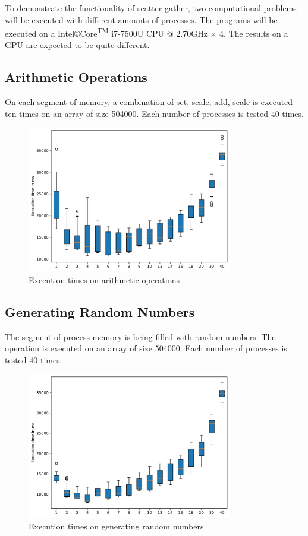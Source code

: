 \documentclass[a4paper]{article}
\begin{document}
To demonstrate the functionality of scatter-gather, two computational problems will be executed with different amounts of processes. The programs will be executed on a Intel\copyright Core\textsuperscript{TM} i7-7500U CPU @ 2.70GHz $\times$ 4. The results on a GPU are expected to be quite different.

\subsection{Arithmetic Operations}
On each segment of memory, a combination of set, scale, add, scale is executed ten times on an array of size 504000. Each number of processes is tested 40 times.

\begin{figure}[ht]
    \includegraphics[width=0.8\textwidth]{figs/dump1.pdf}
    \caption{Execution times on arithmetic operations}
    \label{fig:dump1}
\end{figure}

\subsection{Generating Random Numbers}
The segment of process memory is being filled with random numbers. The operation is executed on an array of size 504000. Each number of processes is tested 40 times.

\begin{figure}[ht]
    \includegraphics[width=0.8\textwidth]{figs/dump2.pdf}
    \caption{Execution times on generating random numbers}
    \label{fig:dump2}
\end{figure}
\end{document}
